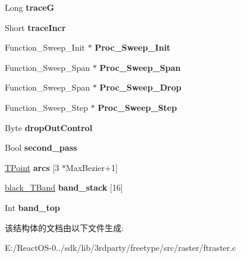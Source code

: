 \begin{DoxyCompactItemize}
Long {\bfseries traceG}
\item 
\mbox{\label{structblack___t_worker___a4c01e6a111f8187a94cb486b542c5f9f}} 
Short {\bfseries trace\+Incr}
\item 
\mbox{\label{structblack___t_worker___a404908f97b339a4e3f9c0b72b146880f}} 
Function\+\_\+\+Sweep\+\_\+\+Init $\ast$ {\bfseries Proc\+\_\+\+Sweep\+\_\+\+Init}
\item 
\mbox{\label{structblack___t_worker___aa964c50e1bd073289d47b52606f35c93}} 
Function\+\_\+\+Sweep\+\_\+\+Span $\ast$ {\bfseries Proc\+\_\+\+Sweep\+\_\+\+Span}
\item 
\mbox{\label{structblack___t_worker___a3486eedb9b40b3fafc83b0b572ac4cd1}} 
Function\+\_\+\+Sweep\+\_\+\+Span $\ast$ {\bfseries Proc\+\_\+\+Sweep\+\_\+\+Drop}
\item 
\mbox{\label{structblack___t_worker___a45269819a967d5188d56b988bd610ee7}} 
Function\+\_\+\+Sweep\+\_\+\+Step $\ast$ {\bfseries Proc\+\_\+\+Sweep\+\_\+\+Step}
\item 
\mbox{\label{structblack___t_worker___a5a4ec492a5a23a9dd903c0ac1f682356}} 
Byte {\bfseries drop\+Out\+Control}
\item 
\mbox{\label{structblack___t_worker___abded870cdd2c1a8b8ea06da788e51090}} 
Bool {\bfseries second\+\_\+pass}
\item 
\mbox{\label{structblack___t_worker___aae219cc82af4d41e25d7d76497f03f3b}} 
\hyperlink{struct_t_point__}{T\+Point} {\bfseries arcs} \mbox{[}3 $\ast$Max\+Bezier+1\mbox{]}
\item 
\mbox{\label{structblack___t_worker___a6c19dd30e12019590354c4dd88544ebb}} 
\hyperlink{structblack___t_band__}{black\+\_\+\+T\+Band} {\bfseries band\+\_\+stack} \mbox{[}16\mbox{]}
\item 
\mbox{\label{structblack___t_worker___aac3918890430137cf8464dd7ff7ad756}} 
Int {\bfseries band\+\_\+top}
\end{DoxyCompactItemize}


该结构体的文档由以下文件生成\+:\begin{DoxyCompactItemize}
\item 
E\+:/\+React\+O\+S-\/0../sdk/lib/3rdparty/freetype/src/raster/ftraster.\+c\end{DoxyCompactItemize}
